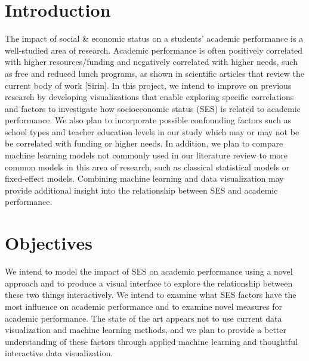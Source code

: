 \documentclass[sigconf,nonacm,11pt]{acmart}
\begin{document}
\section{Introduction}

The impact of  social \& economic status on a students' academic performance  is a well-studied area of research.  Academic performance is often positively correlated with higher resources/funding and negatively correlated with higher needs, such as free and reduced lunch programs, as shown in scientific articles that review the current body of work [Sirin].  In this project, we intend to improve on previous research by developing visualizations that enable exploring specific correlations and factors to investigate how socioeconomic status (SES) is related to academic performance. We also plan to incorporate possible confounding factors such as school types and teacher education levels in our study which may or may not be be correlated with funding or higher needs. In addition, we plan to compare machine learning models not commonly used in our literature review to more common models in this area of research, such as classical statistical models or fixed-effect models. Combining machine learning and data visualization may provide additional insight into the relationship between SES and academic performance.


\section{Objectives}
We intend to model the impact of SES on academic performance using a novel approach and to produce a visual interface to explore the relationship between these two things interactively.  We intend to examine what SES factors have the most influence on academic performance and to examine novel measures for academic performance.  The state of the art appears not to use current data visualization and machine learning methods, and we plan to provide a better understanding of these factors through applied machine learning and thoughtful interactive data visualization. 
\end{document}
